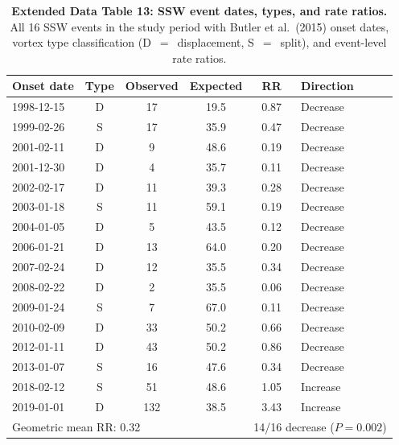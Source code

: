 \documentclass[11pt,letterpaper]{article}
\begin{document}
\begin{table}[!ht]
\centering
\caption{\textbf{Extended Data Table 13: SSW event dates, types, and rate ratios.}
All 16 SSW events in the study period with Butler et al.\ (2015) onset dates, vortex type classification (D~$=$~displacement, S~$=$~split), and event-level rate ratios.}
\label{tab:ssw_dates}
\small
\begin{tabular}{lccccl}
\toprule
Onset date & Type & Observed & Expected & RR & Direction \\
\midrule
1998-12-15 & D & 17 & 19.5 & 0.87 & Decrease \\
1999-02-26 & S & 17 & 35.9 & 0.47 & Decrease \\
2001-02-11 & D & 9 & 48.6 & 0.19 & Decrease \\
2001-12-30 & D & 4 & 35.7 & 0.11 & Decrease \\
2002-02-17 & D & 11 & 39.3 & 0.28 & Decrease \\
2003-01-18 & S & 11 & 59.1 & 0.19 & Decrease \\
2004-01-05 & D & 5 & 43.5 & 0.12 & Decrease \\
2006-01-21 & D & 13 & 64.0 & 0.20 & Decrease \\
2007-02-24 & D & 12 & 35.5 & 0.34 & Decrease \\
2008-02-22 & D & 2 & 35.5 & 0.06 & Decrease \\
2009-01-24 & S & 7 & 67.0 & 0.11 & Decrease \\
2010-02-09 & D & 33 & 50.2 & 0.66 & Decrease \\
2012-01-11 & D & 43 & 50.2 & 0.86 & Decrease \\
2013-01-07 & S & 16 & 47.6 & 0.34 & Decrease \\
2018-02-12 & S & 51 & 48.6 & 1.05 & Increase \\
2019-01-01 & D & 132 & 38.5 & 3.43 & Increase \\
\midrule
\multicolumn{4}{l}{Geometric mean RR: 0.32} & \multicolumn{2}{l}{14/16 decrease ($P = 0.002$)} \\
\bottomrule
\end{tabular}
\end{table}
\end{document}
